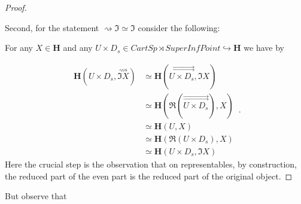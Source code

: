 \documentclass[12pt,titlepage]{article}
\theoremstyle{plain}
\theoremstyle{definition}
\theoremstyle{remark}
\begin{document}
\begin{proof}
$\,$

Second, for the statement $\rightsquigarrow \Im \simeq \Im$ consider the following:

For any $X \in \mathbf{H}$ and any $U \times D_s\in CartSp \rtimes SuperInfPoint \hookrightarrow \mathbf{H}$ we have by  

\begin{displaymath}
\begin{aligned}
    \mathbf{H}(U \times D_s , \stackrel{\rightsquigarrow}{\Im X})
    & \simeq
    \mathbf{H}(\stackrel{\rightrightarrows}{U \times D_s} , \Im X)
    \\
    &\simeq
    \mathbf{H}(\Re(\stackrel{\rightrightarrows}{U \times D_s}) , X)
    \\
    & \simeq
    \mathbf{H}(U, X)
    \\
    & \simeq
    \mathbf{H}(\Re(U \times D_s), X)
    \\
    & \simeq \mathbf{H}(U \times D_s, \Im X)
  \end{aligned}
  \,.
\end{displaymath}
Here the crucial step is the observation that on representables, by construction, the reduced part of the even part is the reduced part of the original object.

\end{proof}
But observe that
\end{document}
